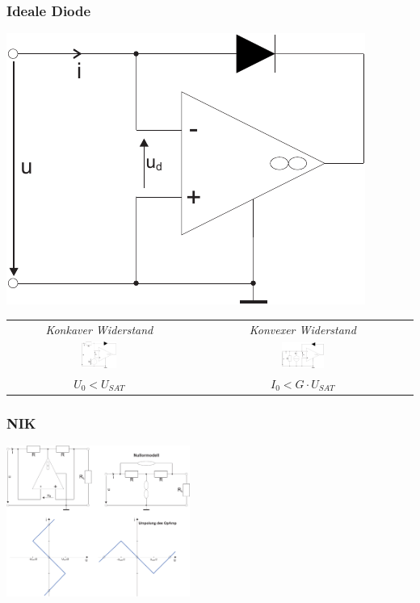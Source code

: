 \documentclass[a4paper,twocolumn,10pt]{article}
\begin{document}
\subsubsection*{Ideale Diode}
\begin{minipage}[b]{0.2\textwidth}
\includegraphics[width=\textwidth]{Grafiken/OP_IdealeDiode}
\end{minipage}

\begin{tabular}{c|c}
	\emph{Konkaver Widerstand} & \emph{Konvexer Widerstand}\\
\includegraphics[width=0.2\textwidth]{Grafiken/OP_Rkonkav} & \includegraphics[width=0.2\textwidth]{Grafiken/OP_Rkonvex}\\
$U_0<U_{SAT}$ & $I_0<G\cdot U_{SAT}$
\end{tabular}

\subsubsection*{NIK}
\includegraphics[width=0.45\textwidth]{Grafiken/OP_NIK}
\end{document}
